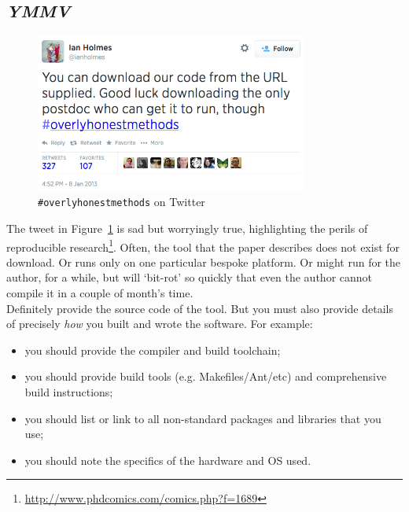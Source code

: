 \documentclass[a4paper,11pt]{article}
\begin{document}
\subsection{{\emph{YMMV}}}

\begin{figure}[!ht]
\centering
\includegraphics[width=0.8\textwidth]{images/overlyhonesttweet.png}
\caption{{\texttt{\#overlyhonestmethods}} on Twitter}
\label{fig:overlyhonestmethod} 
\end{figure}

The tweet in Figure~\ref{fig:overlyhonestmethod} is sad but worryingly
true, highlighting the perils of reproducible
research\footnote{\url{http://www.phdcomics.com/comics.php?f=1689}}. Often,
the tool that the paper describes does not exist for download. Or runs
only on one particular bespoke platform. Or might run for the author,
for a while, but will `bit-rot' so quickly that even the author cannot
compile it in a couple of month's time.\\

 Definitely provide the
source code of the tool. But you must also provide
details of precisely \emph{how} you built and wrote the software. For
example:

\begin{itemize}
\item you should provide the compiler and build toolchain; 
\item you should provide build tools (e.g. Makefiles/Ant/etc) and
  comprehensive build instructions; 
\item you should list or link to all non-standard packages and libraries that you use; 
\item you should note the specifics of the hardware and OS used. 
\end{itemize}
\end{document}
